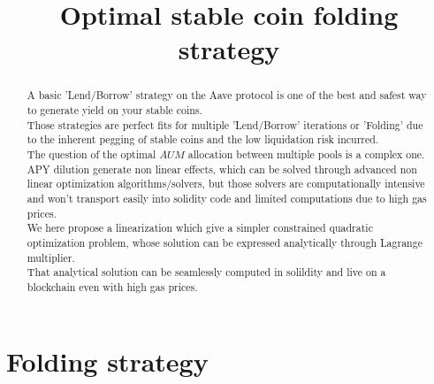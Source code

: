 \documentclass[conference]{IEEEtran}
\begin{document}
\title{Optimal stable coin folding strategy}

\author{
}

\maketitle

\begin{abstract}
A basic 'Lend/Borrow' strategy on the Aave protocol is one of the best and safest way to generate yield on your stable coins.\\
Those strategies are perfect fits for multiple 'Lend/Borrow' iterations or 'Folding' due to the inherent pegging of stable coins and the low liquidation risk incurred.\\
The question of the optimal $AUM$ allocation between multiple pools is a complex one.\\
APY dilution generate non linear effects, which can be solved through advanced non linear optimization algorithms/solvers, but those solvers are computationally intensive and won't transport easily into solidity code and limited computations due to high gas prices.\\
We here propose a linearization which give a simpler constrained quadratic optimization problem, whose solution can be expressed analytically through Lagrange multiplier.\\
That analytical solution can be seamlessly computed in solildity and live on a blockchain even with high gas prices.\\
\end{abstract}
\section{Folding strategy}
\end{document}
